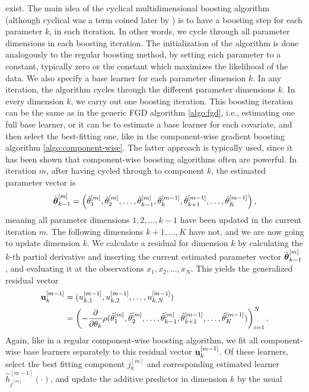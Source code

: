 exist. The main idea of the cyclical multidimensional boosting algorithm (although cyclical was a term coined later by \citet{thomas2018}) is to have a boosting step for each parameter $k$, in each iteration. In other words, we cycle through all parameter dimensions in each boosting iteration. The initialization of the algorithm is done analogously to the regular boosting method, by setting each parameter to a constant, typically zero or the constant which maximizes the likelihood of the data. We also specify a base learner for each parameter dimension $k$. In any iteration, the algorithm cycles through the different parameter dimensions $k$. In every dimension $k$, we carry out one boosting iteration. This boosting iteration can be the same as in the generic FGD algorithm \eqref{algo:fgd}, i.e., estimating one full base learner, or it can be to estimate a base learner for each covariate, and then select the best-fitting one, like in the component-wise gradient boosting algorithm \eqref{algo:component-wise}. The latter approach is typically used, since it has been shown that component-wise boosting algorithms often are powerful. In iteration $m$, after having cycled through to component $k$, the estimated parameter vector is
\begin{equation*}
    \hat{\boldsymbol{\theta}}_{k-1}^{[m]}=\left(\hat{\theta}_1^{[m]},\hat{\theta}_2^{[m]},\ldots,\hat{\theta}_{k-1}^{[m]},\hat{\theta}_{k}^{[m-1]},\hat{\theta}_{k+1}^{[m-1]},\ldots,\hat{\theta}_{K}^{[m-1]}\right),
\end{equation*}
meaning all parameter dimensions $1,2,\ldots,k-1$ have been updated in the current iteration $m$. The following dimensions $k+1,\ldots,K$ have not, and we are now going to update dimension $k$. We calculate a residual for dimension $k$ by calculating the $k$-th partial derivative and inserting the current estimated parameter vector $\hat{\boldsymbol{\theta}}_{k-1}^{[m]}$, and evaluating it at the observations $x_1,x_2,\ldots,x_N$. This yields the generalized residual vector
\begin{align*}
    \mathbf{u}_k^{[m-1]}&=(u_{k,1}^{[m-1]},u_{k,2}^{[m-1]},\ldots,u_{k,N}^{[m-1]})\\
    &=\left(-\frac{\partial}{\partial \theta_k}\rho(\hat{\theta}_1^{[m]},\hat{\theta}_2^{[m]},\ldots,\hat{\theta}_{k-1}^{[m]},\hat{\theta}_{k+1}^{[m-1]},\ldots,\hat{\theta}_{K}^{[m-1]})\right)_{i=1}^N.
\end{align*}
Again, like in a regular component-wise boosting algorithm, we fit all component-wise base learners separately to this residual vector $\mathbf{u}_k^{[m-1]}$. Of these learners, select the best fitting component $j_k^{[m]}$ and corresponding estimated learner $\hat{h}^{[m-1]}_{j^{[m]}}(\cdot)$, and update the additive predictor in dimension $k$ by the usual
